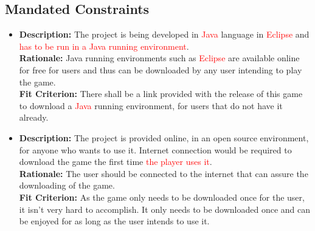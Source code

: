 \documentclass[12pt,letterpaper]{article}
\begin{document}
	\subsection{Mandated Constraints}
	\begin{itemize}
	\item \textbf{Description:} The project is being developed in \textcolor{red}{Java} language in \textcolor{red}{Eclipse} and \textcolor{red}{has to be run in a Java running environment}.\\	
	\textbf{Rationale:} Java running environments such as \textcolor{red}{Eclipse} are available online for free for users and thus can be downloaded by any user intending to play the game.\\	
	\textbf{Fit Criterion:} There shall be a link provided with the release of this game to download a \textcolor{red}{Java} running environment, for users that do not have it already.\\
	\item\textbf{Description:} The project is provided online, in an open source environment, for anyone who wants to use it. Internet connection would be required to download the game the first time \textcolor{red}{the player uses it}.\\	
	\textbf{Rationale:} The user should be connected to the internet that can assure the downloading of the game.\\	
	\textbf{Fit Criterion:} As the game only needs to be downloaded once for the user, it isn’t very hard to accomplish. It only needs to be downloaded once and can be enjoyed for as long as the user intends to use it.
\end{itemize}	
\end{document}
